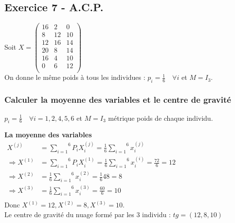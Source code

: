 \documentclass[a4paper, 12pt]{article}
\begin{document}
\subsection{Exercice 7 - A.C.P.}
\begin{flushleft}
Soit $X = 
\begin{pmatrix}
16 & 2 & 0 \\
8 & 12 & 10 \\
12 & 16 & 14 \\
20 & 8 & 14 \\
16 & 4 & 10 \\
0 & 6 & 12 \\
\end{pmatrix}
$ \\

On donne le même poids à tous les individues : $p_i = \frac{1}{6} \quad \forall i$ et $M = I_3$.
\end{flushleft}


\subsubsection{Calculer la moyenne des variables et le centre de gravité}

$p_i = \frac{1}{6} \quad \forall i = 1, 2, 4, 5, 6$ et $M = I_3$ métrique poids de chaque individu. \\

\begin{flushleft}
\textbf{La moyenne des variables} \\
$
\begin{aligned}
X^{(j)} &= \overset{6}{\underset{i = 1}{\sum}} P_i X_i^{(j)} = \frac{1}{6} \overset{6}{\underset{i = 1}{\sum}} x_i^{(j)} \\
\Rightarrow X^{(1)} &= \overset{6}{\underset{i = 1}{\sum}} P_i X_i^{(1)} = \frac{1}{6} \overset{6}{\underset{i = 1}{\sum}} x_i^{(i)} = \frac{72}{6} = 12 \\
\Rightarrow X^{(2)} &= \frac{1}{6} \overset{6}{\underset{i = 1}{\sum}} x_i^{(2)} = \frac{1}{6} 48 = 8 \\
\Rightarrow X^{(3)} &= \frac{1}{6} \overset{6}{\underset{i = 1}{\sum}} x_i^{(3)} = \frac{60}{6} = 10 \\
\end{aligned}
$ \\

Donc $X^{(1)} = 12, X^{(2)} = 8, X^{(3)} = 10$. \\
Le centre de gravité du nuage formé par les 3 individu : $tg = (12, 8, 10)$
\end{flushleft}
\end{document}
